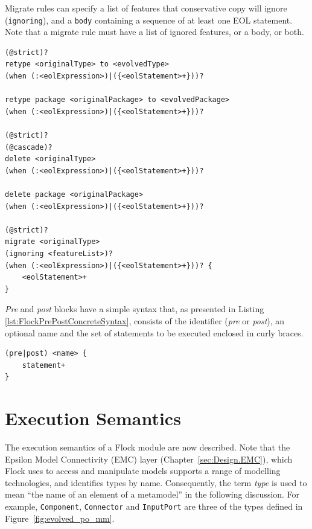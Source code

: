 Migrate rules can specify a list of features that conservative copy will ignore (\texttt{ignoring}), and a \texttt{body} containing a sequence of at least one EOL statement. Note that a migrate rule must have a list of ignored features, or a body, or both.

\begin{lstlisting}[caption={Concrete syntax of Flock retypings, deletions and migrate rules}, label=lst:FlockConcreteSyntax, language=Flock]
(@strict)?
retype <originalType> to <evolvedType>
(when (:<eolExpression>)|({<eolStatement>+}))?

retype package <originalPackage> to <evolvedPackage>
(when (:<eolExpression>)|({<eolStatement>+}))?

(@strict)?
(@cascade)?
delete <originalType>
(when (:<eolExpression>)|({<eolStatement>+}))?

delete package <originalPackage>
(when (:<eolExpression>)|({<eolStatement>+}))?

(@strict)?
migrate <originalType>
(ignoring <featureList>)?
(when (:<eolExpression>)|({<eolStatement>+}))? {
	<eolStatement>+
}
\end{lstlisting}

\emph{Pre} and \emph{post} blocks have a simple syntax that, as presented in Listing \ref{lst:FlockPrePostConcreteSyntax}, consists of the identifier (\emph{pre} or \emph{post}), an optional name and the set of statements to be executed enclosed in curly braces.

\begin{lstlisting}[caption=Concrete Syntax of Pre and Post blocks, label=lst:FlockPrePostConcreteSyntax, language=Flock]
(pre|post) <name> {
	statement+
}
\end{lstlisting}

\section{Execution Semantics}
The execution semantics of a Flock module are now described. Note that the Epsilon Model Connectivity (EMC) layer (Chapter~\ref{sec:Design.EMC}), which Flock uses to access and manipulate models supports a range of modelling technologies, and identifies types by name. Consequently, the term \emph{type} is used to mean ``the name of an element of a metamodel'' in the following discussion. For example, \texttt{Co\-mp\-on\-e\-nt}, \texttt{Co\-nn\-ec\-t\-or} and \texttt{In\-p\-utPo\-rt} are three of the types defined in Figure~\ref{fig:evolved_po_mm}.

